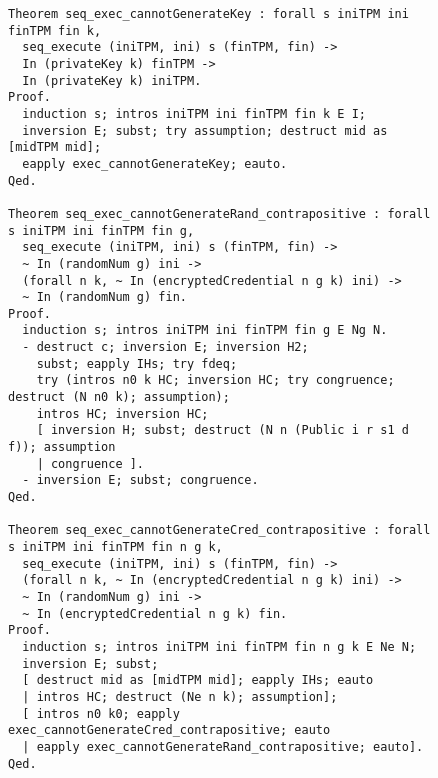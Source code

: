 \begin{figure}[h]
\begin{lstlisting}[language=Coq]
Theorem seq_exec_cannotGenerateKey : forall s iniTPM ini finTPM fin k,
  seq_execute (iniTPM, ini) s (finTPM, fin) ->
  In (privateKey k) finTPM ->
  In (privateKey k) iniTPM.
Proof.
  induction s; intros iniTPM ini finTPM fin k E I;
  inversion E; subst; try assumption; destruct mid as [midTPM mid];
  eapply exec_cannotGenerateKey; eauto.
Qed.

Theorem seq_exec_cannotGenerateRand_contrapositive : forall s iniTPM ini finTPM fin g,
  seq_execute (iniTPM, ini) s (finTPM, fin) ->
  ~ In (randomNum g) ini ->
  (forall n k, ~ In (encryptedCredential n g k) ini) ->
  ~ In (randomNum g) fin.
Proof.
  induction s; intros iniTPM ini finTPM fin g E Ng N.
  - destruct c; inversion E; inversion H2; 
    subst; eapply IHs; try fdeq;
    try (intros n0 k HC; inversion HC; try congruence; destruct (N n0 k); assumption);
    intros HC; inversion HC;
    [ inversion H; subst; destruct (N n (Public i r s1 d f)); assumption
    | congruence ].
  - inversion E; subst; congruence.
Qed.

Theorem seq_exec_cannotGenerateCred_contrapositive : forall s iniTPM ini finTPM fin n g k,
  seq_execute (iniTPM, ini) s (finTPM, fin) ->
  (forall n k, ~ In (encryptedCredential n g k) ini) ->
  ~ In (randomNum g) ini ->
  ~ In (encryptedCredential n g k) fin.
Proof.
  induction s; intros iniTPM ini finTPM fin n g k E Ne N;
  inversion E; subst; 
  [ destruct mid as [midTPM mid]; eapply IHs; eauto
  | intros HC; destruct (Ne n k); assumption];
  [ intros n0 k0; eapply exec_cannotGenerateCred_contrapositive; eauto
  | eapply exec_cannotGenerateRand_contrapositive; eauto].
Qed.
\end{lstlisting}
\end{figure}

